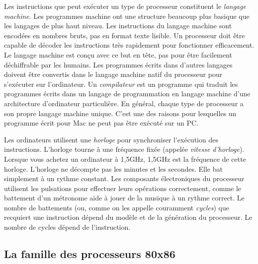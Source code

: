 Les instructions que peut exécuter un type de processeur constituent le
\emph{langage machine}. Les programmes machine ont une structure beaucoup
plus basique que les langages de plus haut niveau. Les instructions du langage
machine sont encodées en nombres bruts, pas en format texte lisible. Un
processeur doit être capable de décoder les instructions très
rapidement pour fonctionner efficacement. Le langage machine est conçu
avec ce but en tête, pas pour être facilement déchiffrable par les humains.
Les programmes écrits dans d'autres langages doivent être convertis dans le
langage machine natif du processeur pour s'exécuter sur l'ordinateur.
Un \emph{compilateur}  est un programme qui traduit les programmes écrits
dans un langage de programmation en langage machine d'une architecture
d'ordinateur particulière. En général, chaque type de processeur a son
propre langage machine unique. C'est une des raisons pour lesquelles un
programme écrit pour Mac ne peut pas être exécuté sur un PC.

Les ordinateurs utilisent une \emph{horloge}  pour synchroniser l'exécution des
 instructions.
L'horloge tourne à une fréquence fixée (appelée \emph{vitesse d'horloge}).
Lorsque vous achetez un ordinateur à 1,5GHz, 1,5GHz est la fréquence de
cette horloge. L'horloge ne décompte pas les minutes et les secondes. Elle
bat simplement à un rythme constant. Les composants électroniques du processeur
utilisent les pulsations pour effectuer leurs opérations correctement,
comme le battement d'un métronome aide à jouer de la musique à un rythme correct.
Le nombre de battements (ou, comme on les appelle couramment \emph{cycles}) que
recquiert une instruction dépend du modèle et de la génération du processeur.
Le nombre de cycles dépend de l'instruction.


\subsection{La famille des processeurs 80x86}

